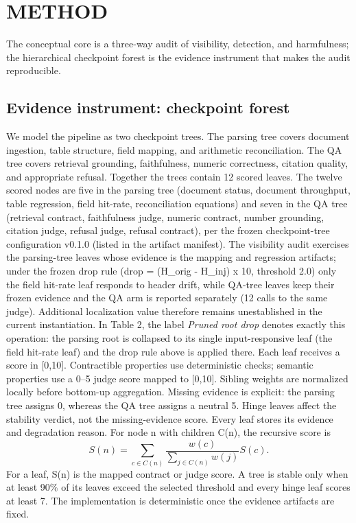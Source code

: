 \documentclass[a4paper,twoside]{article}
\begin{document}
\section{\uppercase{Method}}
The conceptual core is a three-way audit of visibility, detection, and harmfulness; the hierarchical checkpoint forest is the evidence instrument that makes the audit reproducible.
\subsection{Evidence instrument: checkpoint forest}
We model the pipeline as two checkpoint trees. The parsing tree covers document ingestion, table structure, field mapping, and arithmetic reconciliation. The QA tree covers retrieval grounding, faithfulness, numeric correctness, citation quality, and appropriate refusal. Together the trees contain 12 scored leaves.
The twelve scored nodes are five in the parsing tree (document status, document throughput, table regression, field hit-rate, reconciliation equations) and seven in the QA tree (retrieval contract, faithfulness judge, numeric contract, number grounding, citation judge, refusal judge, refusal contract), per the frozen checkpoint-tree configuration v0.1.0 (listed in the artifact manifest). The visibility audit exercises the parsing-tree leaves whose evidence is the mapping and regression artifacts; under the frozen drop rule (drop = (H\_orig - H\_inj) x 10, threshold 2.0) only the field hit-rate leaf responds to header drift, while QA-tree leaves keep their frozen evidence and the QA arm is reported separately (12 calls to the same judge). Additional localization value therefore remains unestablished in the current instantiation. In Table 2, the label \emph{Pruned root drop} denotes exactly this operation: the parsing root is collapsed to its single input-responsive leaf (the field hit-rate leaf) and the drop rule above is applied there.
Each leaf receives a score in [0,10]. Contractible properties use deterministic checks; semantic properties use a 0–5 judge score mapped to [0,10]. Sibling weights are normalized locally before bottom-up aggregation. Missing evidence is explicit: the parsing tree assigns 0, whereas the QA tree assigns a neutral 5. Hinge leaves affect the stability verdict, not the missing-evidence score. Every leaf stores its evidence and degradation reason.
For node n with children C(n), the recursive score is
\[
S(n)=\sum_{c\in C(n)} \frac{w(c)}{\sum_{j\in C(n)}w(j)}S(c).
\]
For a leaf, S(n) is the mapped contract or judge score. A tree is stable only when at least 90\% of its leaves exceed the selected threshold and every hinge leaf scores at least 7. The implementation is deterministic once the evidence artifacts are fixed.
\end{document}
